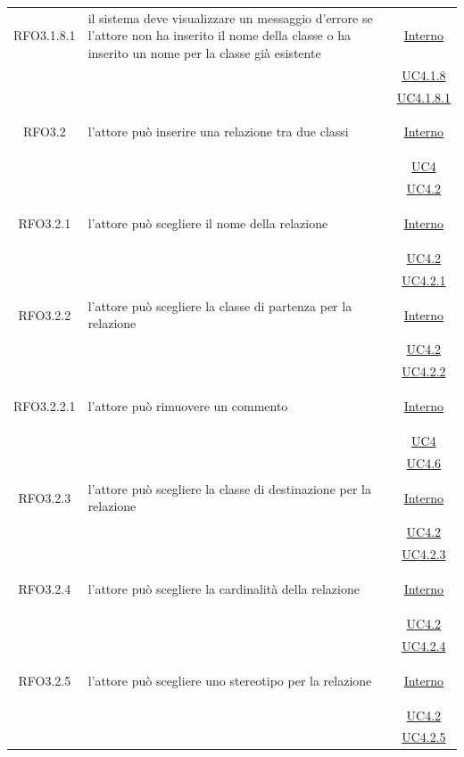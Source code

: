 \begin{longtable}{|c|>{\centering}m{7cm}|c|}
\hypertarget{RFO3.1.8.1}{RFO3.1.8.1} & il sistema deve visualizzare un messaggio d'errore se l'attore non ha inserito il nome della classe o ha inserito un nome per la classe già esistente &  \hyperlink{Interno}{Interno}\\
& &\hyperref[UC4.1.8]{UC4.1.8}\\
& &\hyperref[UC4.1.8.1]{UC4.1.8.1}\\ \hline

\hypertarget{RFO3.2}{RFO3.2} & l'attore può inserire una relazione tra due classi & \hyperlink{Interno}{Interno}\\
& &\hyperref[UC4]{UC4}\\
& &\hyperref[UC4.2]{UC4.2}\\ \hline

\hypertarget{RFO3.2.1}{RFO3.2.1} & l'attore può scegliere il nome della relazione & \hyperlink{Interno}{Interno}\\
& &\hyperref[UC4.2]{UC4.2}\\
& &\hyperref[UC4.2.1]{UC4.2.1}\\ \hline

\hypertarget{RFO3.2.2}{RFO3.2.2} & l'attore può scegliere la classe di partenza per la relazione & \hyperlink{Interno}{Interno}\\
& &\hyperref[UC4.2]{UC4.2}\\
& &\hyperref[UC4.2.2]{UC4.2.2}\\ \hline

\hypertarget{RFO3.2.2.1}{RFO3.2.2.1} & l'attore può rimuovere un commento &  \hyperlink{Interno}{Interno}\\
& &\hyperref[UC4]{UC4}\\
& &\hyperref[UC4.6]{UC4.6}\\ \hline

\hypertarget{RFO3.2.3}{RFO3.2.3} & l'attore può scegliere la classe di destinazione per la relazione & \hyperlink{Interno}{Interno}\\
& &\hyperref[UC4.2]{UC4.2}\\
& &\hyperref[UC4.2.3]{UC4.2.3}\\ \hline

\hypertarget{RFO3.2.4}{RFO3.2.4} & l'attore può scegliere la cardinalità della relazione & \hyperlink{Interno}{Interno}\\
& &\hyperref[UC4.2]{UC4.2}\\
& &\hyperref[UC4.2.4]{UC4.2.4}\\ \hline

\hypertarget{RFO3.2.5}{RFO3.2.5} & l'attore può scegliere uno stereotipo per la relazione & \hyperlink{Interno}{Interno}\\
& &\hyperref[UC4.2]{UC4.2}\\
& &\hyperref[UC4.2.5]{UC4.2.5}\\ \hline


\end{longtable}
